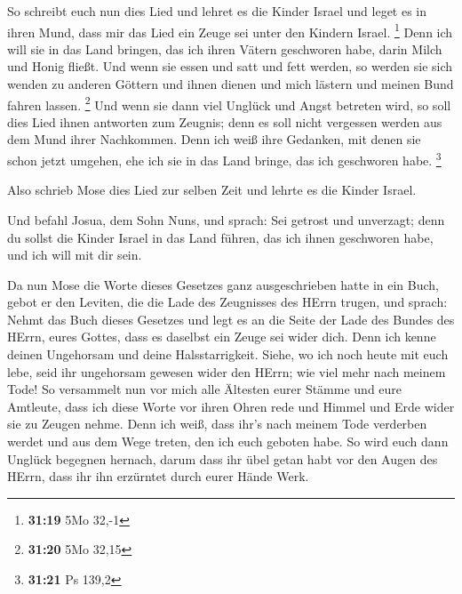  So schreibt euch nun dies Lied und lehret es die Kinder
Israel und leget es in ihren Mund, dass mir das Lied ein Zeuge sei unter
den Kindern Israel. \footnote{\textbf{31:19} 5Mo 32,-1} 
Denn ich will sie in das Land bringen, das ich ihren Vätern geschworen
habe, darin Milch und Honig fließt. Und wenn sie essen und satt und fett
werden, so werden sie sich wenden zu anderen Göttern und ihnen dienen
und mich lästern und meinen Bund fahren lassen. \footnote{\textbf{31:20}
  5Mo 32,15}  Und wenn sie dann viel Unglück und Angst
betreten wird, so soll dies Lied ihnen antworten zum Zeugnis; denn es
soll nicht vergessen werden aus dem Mund ihrer Nachkommen. Denn ich weiß
ihre Gedanken, mit denen sie schon jetzt umgehen, ehe ich sie in das
Land bringe, das ich geschworen habe. \footnote{\textbf{31:21} Ps 139,2}

 Also schrieb Mose dies Lied zur selben Zeit und lehrte es
die Kinder Israel.

 Und befahl Josua, dem Sohn Nuns, und sprach: Sei getrost
und unverzagt; denn du sollst die Kinder Israel in das Land führen, das
ich ihnen geschworen habe, und ich will mit dir sein.

 Da nun Mose die Worte dieses Gesetzes ganz ausgeschrieben
hatte in ein Buch,  gebot er den Leviten, die die Lade des
Zeugnisses des HErrn trugen, und sprach:  Nehmt das Buch
dieses Gesetzes und legt es an die Seite der Lade des Bundes des HErrn,
eures Gottes, dass es daselbst ein Zeuge sei wider dich. 
Denn ich kenne deinen Ungehorsam und deine Halsstarrigkeit. Siehe, wo
ich noch heute mit euch lebe, seid ihr ungehorsam gewesen wider den
HErrn; wie viel mehr nach meinem Tode!  So versammelt nun
vor mich alle Ältesten eurer Stämme und eure Amtleute, dass ich diese
Worte vor ihren Ohren rede und Himmel und Erde wider sie zu Zeugen
nehme.  Denn ich weiß, dass ihr's nach meinem Tode
verderben werdet und aus dem Wege treten, den ich euch geboten habe. So
wird euch dann Unglück begegnen hernach, darum dass ihr übel getan habt
vor den Augen des HErrn, dass ihr ihn erzürntet durch eurer Hände Werk.

